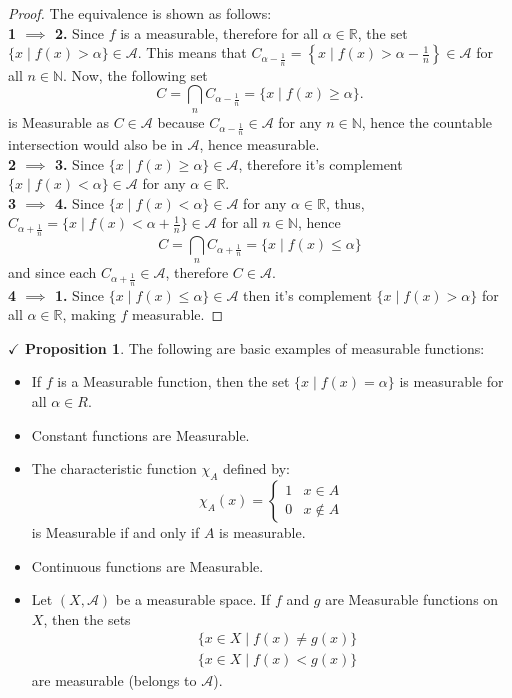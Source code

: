 \documentclass{article}
\theoremstyle{definition}
\theoremstyle{remark}
\theoremstyle{definition}
\theoremstyle{definition}
\newtheorem{proposition}{$\checkmark$ Proposition}
\theoremstyle{definition}
\newcommand{\bintrs}{\bigcap}
\newcommand{\where}{\;\vert\;}
\newcommand{\R}{\mathbb{R}}
\newcommand{\N}{\mathbb{N}}
\newcommand{\alg}[1]{\mathscr{#1}}
\begin{document}
\begin{proof}
	The equivalence is shown as follows:\\
	\textbf{1 $ \implies $ 2.} Since $ f $ is a measurable, therefore for all $ \alpha \in \R $, the set $ \{x\where f(x) > \alpha\} \in \alg{A}$. This means that $ C_{\alpha - \frac{1}{n}} =\left \{x\where f(x) > \alpha - \frac{1}{n} \right \} \in \alg{A}$ for all $ n\in \N $. Now, the following set 
	\[C = \bintrs_{n} C_{\alpha - \frac{1}{n}} = \{x\where f(x) \ge \alpha\}.\]
	is Measurable as $ C \in \alg{A} $ because $ C_{\alpha - \frac{1}{n}} \in \alg{A}$ for any $ n\in \N $, hence the countable intersection would also be in $ \alg{A} $, hence measurable.\\
	\textbf{2 $ \implies $ 3.}
	Since $ \{x\where f(x) \ge \alpha\} \in \alg{A} $, therefore it's complement $ \{x\where f(x) < \alpha\} \in \alg{A}$ for any $ \alpha \in \R $.\\
	\textbf{3 $ \implies $ 4.} Since $ \{x\where f(x)< \alpha\}\in \alg{A} $ for any $ \alpha\in \R $, thus, $ C_{\alpha +\frac{1}{n}} = \{x\where f(x) < \alpha + \frac{1}{n}\} \in \alg{A}$ for all $ n \in \N $, hence 
	\[C = \bintrs_{n} C_{\alpha + \frac{1}{n}} = \{x\where f(x)\le \alpha\}\]
	and since each $ C_{\alpha + \frac{1}{n}} \in \alg{A} $, therefore $ C \in \alg{A}$.\\
	\textbf{4 $ \implies $ 1.} Since $ \{x\where f(x) \le \alpha \} \in \alg{A} $ then it's complement $ \{x\where f(x) >\alpha\} $ for all $ \alpha \in \R $, making $ f $ measurable.
\end{proof}
\hrulefill
\begin{proposition}
	\label{P-18}
	The following are basic examples of measurable functions:
	\begin{itemize}
		\item {If $ f $ is a Measurable function, then the set $ \{x\where f(x) = \alpha\} $ is measurable for all $ \alpha \in R $.}
		\item {Constant functions are Measurable.}
		\item {The characteristic function $ \chi_A $ defined by:
	\[\chi_A(x) = \begin{cases}
		1 & x\in A\\
		0 & x\notin A
	\end{cases}\]	
is Measurable if and only if $ A $ is measurable.	
}
\item {Continuous functions are Measurable.}
\item {Let $ (X,\alg{A}) $ be a measurable space. If $ f $ and $ g $ are Measurable functions on $ X $, then the sets
\begin{equation*}
	\begin{split}
		&\{x\in X\where f(x) \neq g(x)\}\\
		&\{x\in X\where f(x)< g(x)\}
	\end{split}
\end{equation*}
are measurable (belongs to $ \alg{A} $).
}
	\end{itemize}
\end{proposition}
\end{document}
